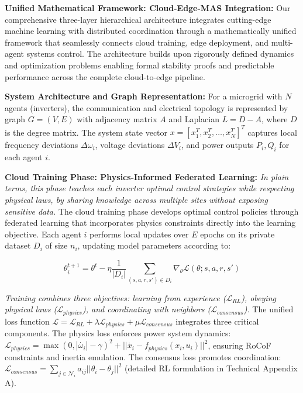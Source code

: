 \documentclass[12pt]{article}
\begin{document}
\textbf{Unified Mathematical Framework: Cloud-Edge-MAS Integration:} Our comprehensive three-layer hierarchical architecture integrates cutting-edge machine learning with distributed coordination through a mathematically unified framework that seamlessly connects cloud training, edge deployment, and multi-agent systems control. The architecture builds upon rigorously defined dynamics and optimization problems enabling formal stability proofs and predictable performance across the complete cloud-to-edge pipeline.

\textbf{System Architecture and Graph Representation:} For a microgrid with $N$ agents (inverters), the communication and electrical topology is represented by graph $G = (V, E)$ with adjacency matrix $A$ and Laplacian $L = D - A$, where $D$ is the degree matrix. The system state vector $x = [x_1^T, x_2^T, \ldots, x_N^T]^T$ captures local frequency deviations $\Delta\omega_i$, voltage deviations $\Delta V_i$, and power outputs $P_i, Q_i$ for each agent $i$.

\textbf{Cloud Training Phase: Physics-Informed Federated Learning:} \textit{In plain terms, this phase teaches each inverter optimal control strategies while respecting physical laws, by sharing knowledge across multiple sites without exposing sensitive data.} The cloud training phase develops optimal control policies through federated learning that incorporates physics constraints directly into the learning objective. Each agent $i$ performs local updates over $E$ epochs on its private dataset $D_i$ of size $n_i$, updating model parameters according to:

$$\theta_i^{t+1} = \theta^t - \eta \frac{1}{|D_i|} \sum_{(s,a,r,s') \in D_i} \nabla_{\theta} \mathcal{L}(\theta; s, a, r, s')$$

\textit{Training combines three objectives: learning from experience ($\mathcal{L}_{RL}$), obeying physical laws ($\mathcal{L}_{physics}$), and coordinating with neighbors ($\mathcal{L}_{consensus}$).} The unified loss function $\mathcal{L} = \mathcal{L}_{RL} + \lambda \mathcal{L}_{physics} + \mu \mathcal{L}_{consensus}$ integrates three critical components. The physics loss enforces power system dynamics: $\mathcal{L}_{physics} = \max(0, |\dot{\omega_i}| - \gamma)^2 + ||\dot{x_i} - f_{physics}(x_i, u_i)||^2$, ensuring RoCoF constraints and inertia emulation. The consensus loss promotes coordination: $\mathcal{L}_{consensus} = \sum_{j \in \mathcal{N}_i} a_{ij} ||\theta_i - \theta_j||^2$ (detailed RL formulation in Technical Appendix A).
\end{document}
